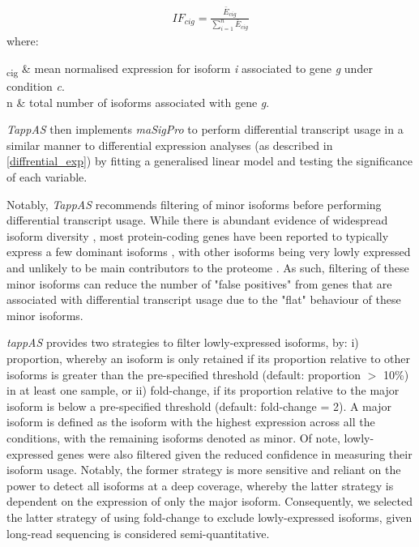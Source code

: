 \begin{myequation}[!h]
	\label{eqn:tappas_IF}
	\begin{align}
		IF_{cig} = \frac{\bar{E}_{cig}}{\sum_{i=1}^{n}\bar{E}_{cig}}
	\end{align}
	where:
	\begin{conditions*}
		\hspace{3mm}\textsubscript{cig} & mean normalised expression for isoform \textit{i} associated to gene \textit{g} under condition \textit{c}.\\
		\hspace{3mm}n  & total number of isoforms associated with gene \textit{g}.
	\end{conditions*}
\end{myequation}


\textit{TappAS} then implements \textit{maSigPro} to perform differential transcript usage in a similar manner to differential  expression analyses (as described in \cref{diffrential_exp}) by fitting a generalised linear model and testing the significance of each variable. 

Notably, \textit{TappAS} recommends filtering of minor isoforms before performing differential transcript usage. While there is abundant evidence of widespread isoform diversity \cite{Wang2008}, most protein-coding genes have been reported to typically express a few dominant isoforms \cite{Gonzalez-Porta2013, Ezkurdia2015}, with other isoforms being very lowly expressed and unlikely to be main contributors to the proteome \cite{Gonzalez-Porta2013}. As such, filtering of these minor isoforms can reduce the number of "false positives" from genes that are associated with differential transcript usage due to the "flat" behaviour of these minor isoforms\cite{DeLaFuente2020}. 

\textit{tappAS} provides two strategies to filter lowly-expressed isoforms, by: i) proportion, whereby an isoform is only retained if its proportion relative to other isoforms is greater than the pre-specified threshold (default: proportion $>$ 10\%) in at least one sample, or ii) fold-change, if its proportion relative to the major isoform is below a pre-specified threshold (default: fold-change = 2). A major isoform is defined as the isoform with the highest expression across all the conditions, with the remaining isoforms denoted as minor. Of note, lowly-expressed genes were also filtered given the reduced confidence in measuring their isoform usage. Notably, the former strategy is more sensitive and reliant on the power to detect all isoforms at a deep coverage, whereby the latter strategy is dependent on the expression of only the major isoform. Consequently, we selected the latter strategy of using fold-change to exclude lowly-expressed isoforms, given long-read sequencing is considered semi-quantitative. 